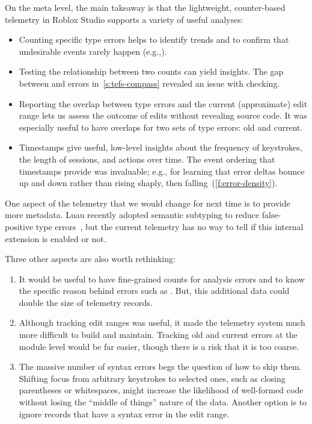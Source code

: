 \documentclass[english,submission,cleveref]{programming}
\begin{document}
On the meta level, the main takeaway is that the lightweight, counter-based telemetry
in Roblox Studio supports a variety of useful analyses:
\begin{itemize}
  \item
    Counting specific type errors helps to identify trends and to confirm that
    undesirable events rarely happen (e.g.,).
  \item
    Testing the relationship between two counts can yield insights.
    The gap between \mstrict{} and \FS{} errors in~\cref{s:tefs-compass}
    revealed an issue with \mstrict{} checking.
  \item
    Reporting the overlap between type errors and the current (approximate) edit
    range lets us assess the outcome of edits without revealing source code.
    It was especially useful to have overlaps for two sets of type errors: old and current.
  \item
    Timestamps give useful, low-level insights about the frequency of keystrokes,
    the length of sessions, and actions over time.
    The event ordering that timestamps provide was invaluable; e.g., for learning
    that error deltas bounce up and down rather than rising shaply, then falling~(\cref{f:error-density}).
\end{itemize}

One aspect of the telemetry that we would change for next time is to provide
more metadata.
Luau recently adopted semantic subtyping to reduce false-positive type
errors~\cite{CF05:GentleIntroduction,Jef22:SemanticSubtyping}, but the current
telemetry has no way to tell if this
internal extension is enabled or not.

Three other aspects are also worth rethinking:
\begin{enumerate}

  \item It would be useful to have fine-grained counts for \FS{} analysis
errors and to know the specific reason behind errors such as .
But, this additional data could double the size of telemetry records.

\item Although tracking edit ranges was useful, it made the telemetry system
much more difficult to build and maintain.
Tracking old and current errors at the module level would be far easier,
though there is a risk that it is too coarse.

\item The massive number of syntax errors begs the question of how to skip
them.
Shifting focus from arbitrary keystrokes to selected ones, such as closing
parentheses or whitespaces, might increase the likelihood of well-formed
code without losing the ``middle of things'' nature of the data.
Another option is to ignore records that have a syntax error in the edit range.
\end{enumerate}
\end{document}

